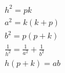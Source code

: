 \newpage
\section{
 }

\begin{figure}[h!]
	\centering
\end{figure}

\begin{gather}
	h^2           = pk \\
	a^2           = k (k + p) \\
	b^2           = p (p + k) \\
	\frac{1}{h^2} = \frac{1}{a^2} + \frac{1}{b^2} \\
	h (p + k)     = a b
\end{gather}

